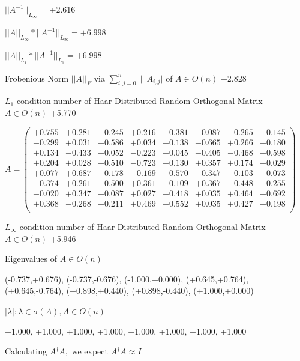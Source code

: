 \documentclass[9pt]{article}
\theoremstyle{plain}
\theoremstyle{definition}
\theoremstyle{remark}
\numberwithin{equation}{section}
\begin{document}
$||A^{-1}||_{L_{\infty}}$ = +2.616

$||A||_{L_{\infty}} * ||A^{-1}||_{L_{\infty}} = +6.998$

$||A||_{L_1} * ||A^{-1}||_{L_1} = +6.998$

Frobenious Norm  $||A||_{\textit{F}}$ via $\sum\limits_{i,j =0}^{n} \|A_{i,j}|$   of  $A \in O(n)$  +2.828

$L_1$ condition number of Haar Distributed Random Orthogonal Matrix $A \in O(n)$ +5.770

$A = \left(
\begin{array}{
cccccccc}
+0.755 & +0.281 & -0.245 & +0.216 & -0.381 & -0.087 & -0.265 & -0.145 \\
-0.299 & +0.031 & -0.586 & +0.034 & -0.138 & -0.665 & +0.266 & -0.180 \\
+0.134 & -0.433 & -0.052 & -0.223 & +0.045 & -0.405 & -0.468 & +0.598 \\
+0.204 & +0.028 & -0.510 & -0.723 & +0.130 & +0.357 & +0.174 & +0.029 \\
+0.077 & +0.687 & +0.178 & -0.169 & +0.570 & -0.347 & -0.103 & +0.073 \\
-0.374 & +0.261 & -0.500 & +0.361 & +0.109 & +0.367 & -0.448 & +0.255 \\
-0.020 & +0.347 & +0.087 & +0.027 & -0.418 & +0.035 & +0.464 & +0.692 \\
+0.368 & -0.268 & -0.211 & +0.469 & +0.552 & +0.035 & +0.427 & +0.198 \\
\end{array}
\right)$ \newline 

$L_{\infty}$ condition number of Haar Distributed Random Orthogonal Matrix $A \in O(n)$ +5.946

Eigenvalues of $A \in O(n)$

(-0.737,+0.676), (-0.737,-0.676), (-1.000,+0.000), (+0.645,+0.764), (+0.645,-0.764), (+0.898,+0.440), (+0.898,-0.440), (+1.000,+0.000)

 $|\lambda | : \lambda \in \sigma(A) , A \in O(n)$

+1.000, +1.000, +1.000, +1.000, +1.000, +1.000, +1.000, +1.000


Calculating $A^{\dag} A,$  we expect $A^{\dag} A \approx I$
\end{document}
